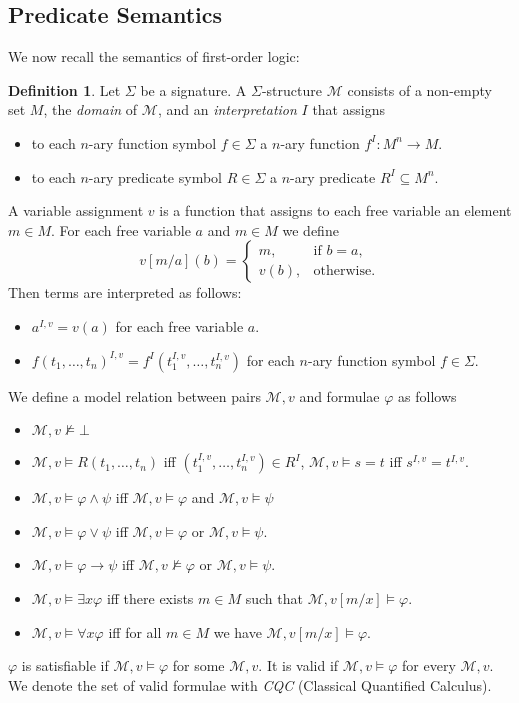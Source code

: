 \documentclass{easychair}
\theoremstyle{definition}
\theoremstyle{definition}
\theoremstyle{definition}
\theoremstyle{definition}
\theoremstyle{definition}
\newtheorem{definition}[theorem]{Definition}
\theoremstyle{definition}
\theoremstyle{definition}
\begin{document}
\subsection{Predicate Semantics}

We now recall the semantics of first-order logic:

\begin{definition}
	Let $\Sigma$ be a signature. A $\Sigma$-structure $\mathcal{M}$ consists of a non-empty set $M$, the \emph{domain} of $\mathcal{M}$, and an \emph{interpretation} $I$ that assigns
	\begin{itemize}
		\item to each $n$-ary function symbol $f\in\Sigma$ a $n$-ary function $f^I: M^n\to M$.
		\item to each $n$-ary predicate symbol $R\in\Sigma$ a $n$-ary predicate $R^I\subseteq M^n$.
	\end{itemize}
	A variable assignment $v$ is a function that assigns to each free variable an element $m\in M$. For each free variable $a$ and $m\in M$ we define $$v[m/a](b) = \begin{cases}
	m, &\text{if $b=a$,}\\
	v(b), &\text{otherwise.}
	\end{cases}$$
	Then terms are interpreted as follows:
	\begin{itemize}
		\item $a^{I, v} = v(a)$ for each free variable $a$.
		\item $f(t_1,\dots,t_n)^{I, v} = f^I(t_1^{I, v},\dots, t_n^{I, v})$ for each $n$-ary function symbol $f\in\Sigma$.
	\end{itemize}
	We define a model relation between pairs $\mathcal M, v$ and formulae $\varphi$ as follows
	\begin{itemize}
		\item $\mathcal M, v\not\models\bot$
		\item $\mathcal M, v\models R(t_1,\dots,t_n)$ iff $(t_1^{I, v},\dots,t_n^{I, v})\in R^I$, $\mathcal M, v\models s = t$ iff $s^{I, v} = t^{I, v}$.
		\item $\mathcal M, v\models \varphi\wedge \psi$ iff $\mathcal M, v\models\varphi$ and $\mathcal M, v\models\psi$
		\item $\mathcal M, v\models \varphi\vee\psi$ iff $\mathcal M, v\models\varphi$ or $\mathcal M, v\models\psi$.
		\item $\mathcal M, v\models \varphi\to\psi$ iff $\mathcal M, v\not\models\varphi$ or $\mathcal M, v\models\psi$.
		\item $\mathcal M, v\models\exists x\varphi$ iff there exists $m\in M$ such that $\mathcal M, v[m/x]\models\varphi$.
		\item $\mathcal M, v\models\forall x\varphi$ iff for all $m\in M$ we have $\mathcal M, v[m/x]\models\varphi$.
	\end{itemize}
	$\varphi$ is satisfiable if $\mathcal M, v\models\varphi$ for some $\mathcal M, v$. It is valid if $\mathcal M, v\models\varphi$ for every $\mathcal M, v$. We denote the set of valid formulae with \emph{CQC} (Classical Quantified Calculus).
\end{definition}
\end{document}
